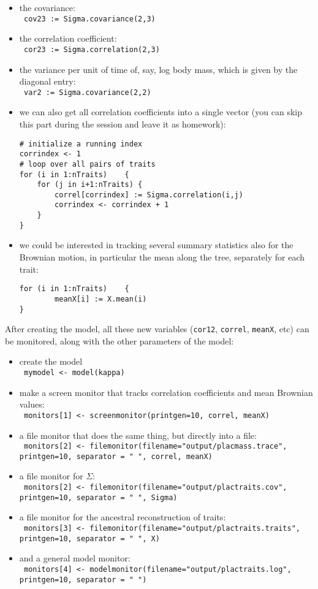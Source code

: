 \documentclass[usletter]{article}
\newcommand{\cmd}[1]{\texttt{#1}}
\begin{document}
\begin{itemize}
\item
the covariance:
\\
\cmd{
cov23 := Sigma.covariance(2,3)
}
\item
the correlation coefficient:
\\
\cmd{
cor23 := Sigma.correlation(2,3)
}
\item
the variance per unit of time of, say, log body mass, which is given by the diagonal entry:
\\
\cmd{
var2 := Sigma.covariance(2,2)
}
\item
we can also get all correlation coefficients into a single vector (you can skip this part during the session and leave it as  homework):
\begin{verbatim}
# initialize a running index
corrindex <- 1
# loop over all pairs of traits
for (i in 1:nTraits)    {
    for (j in i+1:nTraits) {
        correl[corrindex] := Sigma.correlation(i,j)
        corrindex <- corrindex + 1
    }
}
\end{verbatim}
\item
we could be interested in tracking several summary statistics also for the Brownian motion, in particular the mean along the tree, separately for each trait:
\begin{verbatim}
for (i in 1:nTraits)    {
        meanX[i] := X.mean(i)
}
\end{verbatim}
\end{itemize}
After creating the model, all these new variables (\cmd{cor12}, \cmd{correl}, \cmd{meanX}, etc) can be monitored, along with the other parameters of the model:
\begin{itemize}
\item
create the model
\\
\cmd{
mymodel <- model(kappa)
}
\item
make a screen monitor that tracks correlation coefficients and mean Brownian values:
\\
\cmd{
monitors[1] <- screenmonitor(printgen=10, correl, meanX)
}
\item
a file monitor that does the same thing, but directly into a file:
\\
\cmd{
monitors[2] <- filemonitor(filename="output/placmass.trace", printgen=10, separator = "       ", correl, meanX)
}
\item
a file monitor for $\Sigma$:
\\
\cmd{
monitors[2] <- filemonitor(filename="output/plactraits.cov", printgen=10, separator = "  ", Sigma)
}
\item
a file monitor for the ancestral reconstruction of traits:
\\
\cmd{
monitors[3] <- filemonitor(filename="output/plactraits.traits", printgen=10, separator = "       ", X)
}
\item
and a general model monitor:
\\
\cmd{
monitors[4] <- modelmonitor(filename="output/plactraits.log", printgen=10, separator = " ")
}
\end{itemize}
\end{document}
